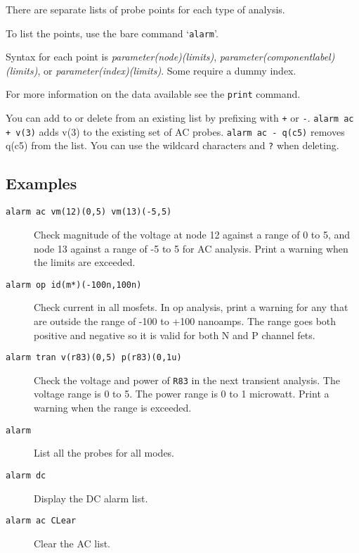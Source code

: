 There are separate lists of probe points for each type of analysis.

To list the points, use the bare command `{\tt alarm}'.

Syntax for each point is {\it parameter(node)(limits)}, {\it
parameter(componentlabel)(limits)}, or {\it
parameter(index)(limits)}. Some require a dummy index.

For more information on the data available see the {\tt print}
command.

You can add to or delete from an existing list by prefixing with
{\tt +} or {\tt -}.  {\tt alarm ac + v(3)} adds v(3) to the existing
set of AC probes.  {\tt alarm ac - q(c5)} removes q(c5) from the
list.  You can use the wildcard characters {\tt *} and {\tt ?} when
deleting.
\subsection{Examples}

\begin{description}

\item[{\tt alarm ac vm(12)(0,5) vm(13)(-5,5)}] Check magnitude of
the voltage at node 12 against a range of 0 to 5, and node 13
against a range of -5 to 5 for AC analysis.  Print a warning when
the limits are exceeded.

\item[{\tt alarm op id(m*)(-100n,100n)}] Check current in all mosfets.
In op analysis, print a warning for any that are outside the range of
-100 to +100 nanoamps.  The range goes both positive and negative so
it is valid for both N and P channel fets.

\item[{\tt alarm tran v(r83)(0,5) p(r83)(0,1u)}] Check the voltage
and power of {\tt R83} in the next transient analysis.  The voltage
range is 0 to 5.  The power range is 0 to 1 microwatt.  Print a
warning when the range is exceeded.

\item[{\tt alarm}] List all the probes for all modes.

\item[{\tt alarm dc}] Display the DC alarm list.

\item[{\tt alarm ac CLear}] Clear the AC list.

\end{description}

